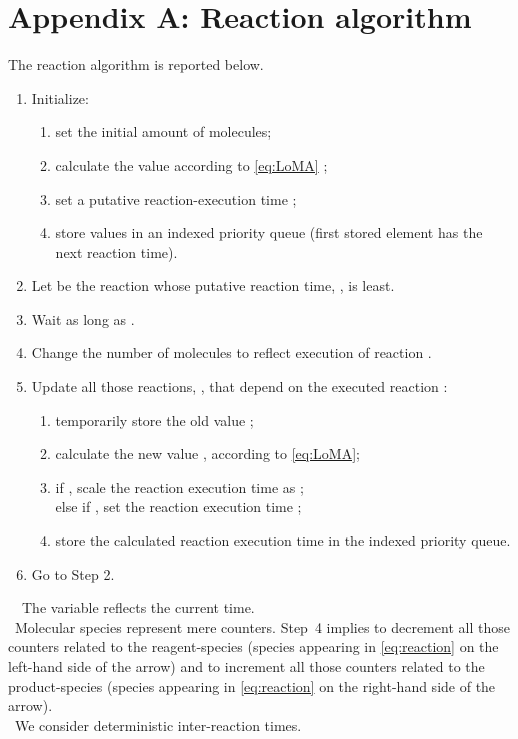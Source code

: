 \documentclass[journal]{IEEEtran}
\begin{document}
{\section*{Appendix A: Reaction algorithm}
{The reaction algorithm  is reported below.}
{
\begin{enumerate}
	\item Initialize: 
	\begin{enumerate}
			\item set the initial amount of molecules;
			\item calculate the value  according to \eqref{eq:LoMA} ; 
			\item set a putative reaction-execution time  ;
			\item store  values in an indexed priority queue (first stored element has the next reaction time). 				\end{enumerate}		
	\item Let  be the reaction whose putative reaction time, , is least. 
	\item Wait as long as .
	\item Change the number of molecules to reflect execution of reaction . 
	\item Update all those reactions, , that depend on the executed reaction :
	\begin{enumerate}
			\item  temporarily store the old value ; 
			\item  calculate the new value , according to \eqref{eq:LoMA}; 
			\item if , scale the reaction execution time as ; \\
			else if , set the reaction execution time ; 
			\item store the calculated reaction execution time  in the indexed priority queue.
	\end{enumerate}
	\item Go to Step 2.
	\end{enumerate}
	~~The variable  reflects the current time.\\
	~Molecular species represent mere counters. Step~4 implies to decrement all those counters related to the reagent-species (species appearing in \eqref{eq:reaction} on the left-hand side of the arrow) and to increment all those counters related to the product-species (species appearing in \eqref{eq:reaction} on the right-hand side of the arrow).\\
	~We consider deterministic inter-reaction times.
}



}
\end{document}
